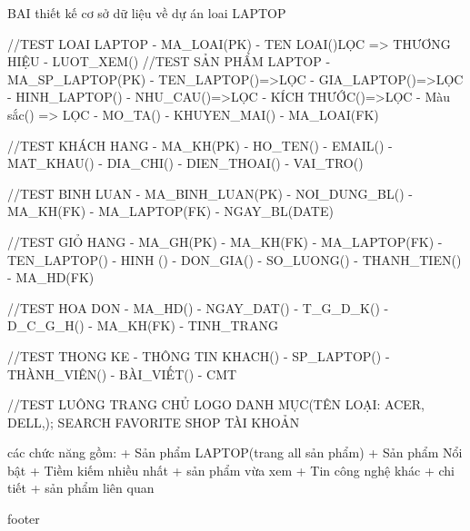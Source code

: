BAI thiết kế cơ sở dữ liệu về dự án loai LAPTOP

//TEST LOAI LAPTOP
- MA_LOAI(PK)
- TEN LOAI()LỌC => THƯƠNG HIỆU
- LUOT_XEM()
//TEST SẢN PHẨM LAPTOP
- MA_SP_LAPTOP(PK)
- TEN_LAPTOP()=>LỌC
- GIA_LAPTOP()=>LỌC
- HINH_LAPTOP()
- NHU_CAU()=>LỌC
- KÍCH THƯỚC()=>LỌC
- Màu sắc() => LỌC
- MO_TA()
- KHUYEN_MAI()
- MA_LOAI(FK)


//TEST KHÁCH HANG
- MA_KH(PK)
- HO_TEN()
- EMAIL()
- MAT_KHAU()
- DIA_CHI()
- DIEN_THOAI()
- VAI_TRO()

//TEST BINH LUAN
- MA_BINH_LUAN(PK)
- NOI_DUNG_BL()
- MA_KH(FK)
- MA_LAPTOP(FK)
- NGAY_BL(DATE)

//TEST GIỎ HANG
- MA_GH(PK)
- MA_KH(FK)
- MA_LAPTOP(FK)
- TEN_LAPTOP()
- HINH ()
- DON_GIA()
- SO_LUONG()
- THANH_TIEN()
- MA_HD(FK)

//TEST HOA DON
- MA_HD()
- NGAY_DAT()
- T_G_D_K()
- D_C_G_H()
- MA_KH(FK)
- TINH_TRANG

//TEST THONG KE
- THÔNG TIN KHACH()
- SP_LAPTOP()
- THÀNH_VIÊN()
- BÀI_VIẾT()
- CMT 

//TEST LUÔNG
TRANG CHỦ 
LOGO
DANH MỤC(TÊN LOẠI: ACER, DELL,);
SEARCH
FAVORITE
SHOP
TÀI KHOẢN

các chức năng gồm:
+ Sản phẩm LAPTOP(trang all sản phẩm)
+ Sản phẩm Nổi bật
+ Tiềm kiếm nhiều nhất
+ sản phẩm vừa xem
+ Tin công nghệ
khác 
+ chi tiết
+ sản phẩm liên quan

footer